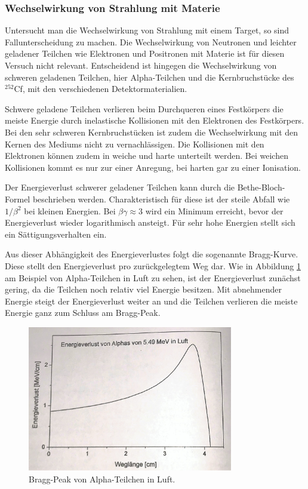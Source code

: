 \subsubsection{Wechselwirkung von Strahlung mit Materie}

Untersucht man die Wechselwirkung von Strahlung mit einem Target, so sind Fallunterscheidung zu machen. Die Wechselwirkung von Neutronen und leichter geladener Teilchen wie Elektronen und Positronen mit Materie ist für diesen Versuch nicht relevant. Entscheidend ist hingegen die Wechselwirkung von schweren geladenen Teilchen, hier Alpha-Teilchen und die  Kernbruchstücke des $^{252}$Cf, mit den verschiedenen Detektormaterialien. 

Schwere geladene Teilchen verlieren beim Durchqueren eines Festkörpers die meiste Energie durch inelastische Kollisionen mit den Elektronen des Festkörpers. Bei den sehr schweren Kernbruchstücken ist zudem die Wechselwirkung mit den Kernen des Mediums nicht zu vernachlässigen. Die Kollisionen mit den Elektronen können zudem in weiche und harte unterteilt werden. Bei weichen Kollisionen kommt es nur zur einer Anregung, bei harten gar zu einer Ionisation. 

Der Energieverlust schwerer geladener Teilchen kann durch die Bethe-Bloch-Formel beschrieben werden. Charakteristisch für diese ist der steile Abfall wie $1/\beta^2$ bei kleinen Energien. Bei $\beta\gamma\approx3$ wird ein Minimum erreicht, bevor der Energieverlust wieder logarithmisch ansteigt. Für sehr hohe Energien stellt sich ein Sättigungsverhalten ein.

Aus dieser Abhängigkeit des Energieverlustes folgt die sogenannte Bragg-Kurve. Diese stellt den Energieverlust pro zurückgelegtem Weg dar. Wie in Abbildung \ref{bragg} am Beispiel von Alpha-Teilchen in Luft zu sehen, ist der Energieverlust zunächst gering, da die Teilchen noch relativ viel Energie besitzen. Mit abnehmender Energie steigt der Energieverlust weiter an und die Teilchen verlieren die meiste Energie ganz zum Schluss am Bragg-Peak.

\vspace{0,3cm}

\begin{figure}[h]
	\centering
	\includegraphics[width=0.8\textwidth]{img/bragg}
	\caption{Bragg-Peak von Alpha-Teilchen in Luft. \cite{bragg}}
	\label{bragg}
\end{figure}


